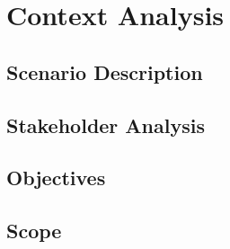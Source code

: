 
\chapter{Context Analysis} %
\label{cha:context_analysis}

\section{Scenario Description}
\label{sec:scenario_description}


\section{Stakeholder Analysis}
\label{sec:stakeholder_analysis}


\section{Objectives}
\label{sec:objectives}


\section{Scope}
\label{sec:scope}



